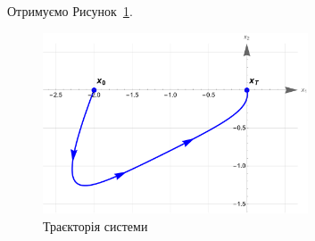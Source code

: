 \documentclass{hw_template}
\begin{document}
Отримуємо Рисунок~\ref{fig:trajectory}.

\begin{figure}[H]
    \centering
    \includegraphics[width=0.7\textwidth]{figures/homework_1.pdf}
    \caption{Траєкторія системи}
    \label{fig:trajectory}
\end{figure}
\end{document}
